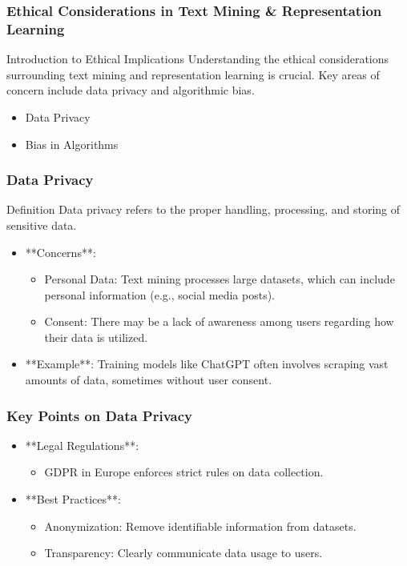 \documentclass[aspectratio=169]{beamer}
\begin{document}
\begin{frame}[fragile]
    \frametitle{Ethical Considerations in Text Mining \& Representation Learning}
    \begin{block}{Introduction to Ethical Implications}
        Understanding the ethical considerations surrounding text mining and representation learning is crucial. Key areas of concern include data privacy and algorithmic bias.
    \end{block}
    \begin{itemize}
        \item Data Privacy
        \item Bias in Algorithms
    \end{itemize}
\end{frame}

\begin{frame}[fragile]
    \frametitle{Data Privacy}
    \begin{block}{Definition}
        Data privacy refers to the proper handling, processing, and storing of sensitive data.
    \end{block}
    \begin{itemize}
        \item **Concerns**:
            \begin{itemize}
                \item Personal Data: Text mining processes large datasets, which can include personal information (e.g., social media posts).
                \item Consent: There may be a lack of awareness among users regarding how their data is utilized.
            \end{itemize}
        \item **Example**: Training models like ChatGPT often involves scraping vast amounts of data, sometimes without user consent.
    \end{itemize}
\end{frame}

\begin{frame}[fragile]
    \frametitle{Key Points on Data Privacy}
    \begin{itemize}
        \item **Legal Regulations**: 
            \begin{itemize}
                \item GDPR in Europe enforces strict rules on data collection.
            \end{itemize}
        \item **Best Practices**:
            \begin{itemize}
                \item Anonymization: Remove identifiable information from datasets.
                \item Transparency: Clearly communicate data usage to users.
            \end{itemize}
    \end{itemize}
\end{frame}
\end{document}
